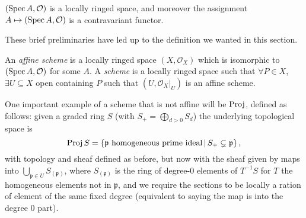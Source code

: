 \documentclass[000-main.tex]{subfiles}
\begin{document}
\begin{example}
  $(\operatorname{Spec} A, \mathcal{O})$ is a locally ringed space, and moreover the assignment $A \mapsto (\operatorname{Spec} A , \mathcal{O})$ is a contravariant functor.
\end{example}

These brief preliminaries have led up to the definition we wanted in this section. 

\begin{definition}
  An \emph{affine scheme} is a locally ringed space $(X, \mathcal{O}_X)$ which is isomorphic to $(\operatorname{Spec} A, \mathcal{O})$ for some $A$.
  A \emph{scheme} is a locally ringed space such that $\forall P \in X$, $\exists U \subseteq X$ open containing $P$ such that $(U, \left . \mathcal{O}_X \right \rvert_{U})$ is an affine scheme.
\end{definition}

\begin{example}
\end{example}

One important example of a scheme that is not affine will be $\operatorname{Proj}$, defined as follows: given a graded ring $S$ (with $S_+ = \bigoplus_{d > 0 } S_d$) the underlying topological space is 
\[
  \operatorname{Proj} S = \left \lbrace \mathfrak{p} \text{ homogeneous prime ideal} \, | \, S_+ \subsetneq \mathfrak{p} \right \rbrace ,
\] 
with topology and sheaf defined as before, but now with the sheaf given by maps into $\bigcup_{\mathfrak{p} \in U} S_{(\mathfrak{p})}$, where $S_{(\mathfrak{p})}$ is the ring of degree-0 elements of $T^{-1}S$ for $T$ the homogeneous elements not in $\mathfrak{p}$, and we require the sections to be locally a ration of element of the same fixed degree (equivalent to saying the map is into the degree 0 part). 

\end{document}
